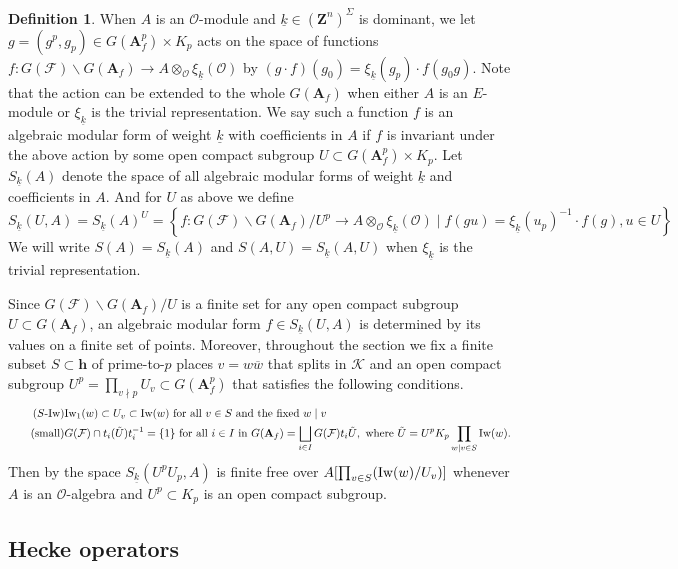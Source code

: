 \documentclass[leqno]{amsart}
\theoremstyle{definition}
\newtheorem{defn}[thm]{Definition}
\theoremstyle{remark}
\newcommand{\oo}{\mathcal{O}}
\newcommand{\Z}{{\mathbf{Z}}}
\newcommand{\A}{\mathbf A}
\newcommand{\finite}{\mathbf{h}}
\newcommand{\F}{{\mathcal{F}}} %
\newcommand{\K}{{\mathcal{K}}} %
\newcommand{\bw}{{\overline{w}}}
\newcommand{\wt}[1]{\underline{ #1 }}
\newcommand{\Iw}{\textnormal{Iw}} %
\begin{document}
\begin{defn}\label{def:algform}
When $A$ is an $\oo$-module and  
$\wt{k}\in (\Z^n)^{\Sigma}$ is dominant,
we let $g=(g^p,g_p)\in G(\A_f^p)\times K_p$ acts on 
the space of functions
$f\colon G(\F)\backslash G(\A_f)\to A\otimes_{\oo}\xi_{\wt{k}}(\oo)$
by $(g\cdot f)(g_0)=\xi_{\wt{k}}(g_p)\cdot f(g_0g)$.
Note that the action can be extended to the whole $G(\A_f)$
when either $A$ is an $E$-module or $\xi_{\wt{k}}$
is the trivial representation.
We say such a function $f$ is an algebraic modular form of
weight $\wt{k}$ with coefficients in $A$
if $f$ is invariant under the above action 
by some open compact subgroup
$U\subset G(\A_f^p)\times K_p$.
Let $S_{\wt{k}}(A)$
denote the space of all algebraic modular forms
of weight $\wt{k}$ and coefficients in $A$.
And for $U$ as above we define
\begin{equation}
S_{\wt{k}}(U,A)=
S_{\wt{k}}(A)^U=
\left\{ f: G(\F)\backslash G(\A_f)/U^p 
\rightarrow A\otimes_{\oo}\xi_{\wt{k}}(\oo)
\mid f(gu)=\xi_{\wt{k}}(u_p)^{-1}\cdot f(g), u\in U\right\} 
\end{equation}
We will write $S(A)=S_{\wt{k}}(A)$ and
$S(A,U)=S_{\wt{k}}(A,U)$
when $\xi_{\wt{k}}$ is the trivial representation.
\end{defn}


Since $G(\F)\backslash G(\A_f)/U$ is a finite set
for any open compact subgroup $U\subset G(\A_f)$,
an algebraic modular form $f\in S_{\wt{k}}(U,A)$ 
is determined by its values on a finite set of points.
Moreover, throughout the section
we fix a finite subset $S\subset \finite$
of prime-to-$p$ places $v=w\bw$ that splits in $\K$
and an open compact subgroup $U^p=\prod_{v\nmid p}U_v\subset G(\A_f^p)$ 
that satisfies the following conditions.
\begin{align}
    \label{cond:s-ram}\tag{$S$-$\Iw$}
    &\Iw_1(w)\subset U_v \subset \Iw(w) \text{ for all } 
    v\in S \text{ and the fixed }w\mid v\\
    \label{cond:small}\tag{\text{small}}
	&G(\F)\cap t_i(\tilde{U})t_i^{-1}=\{1\} \text{ for all } 
    i\in I \text{ in }
    G(\A_f)=\bigsqcup_{i\in I} G(\F)t_i \tilde{U},
    \text{ where } \tilde{U}=U^pK_p\prod_{w\mid v\in S}\Iw(w).
\end{align}
Then by \cite[Lem 2.6]{ger} the space $S_{\wt{k}}(U^pU_p,A)$
is finite free over 
$A[\prod_{v\in S}(\Iw(w)/U_v)]$
whenever $A$ is an $\oo$-algebra
and $U^p\subset K_p$ is an open compact subgroup.

\subsection{Hecke operators}
\end{document}
